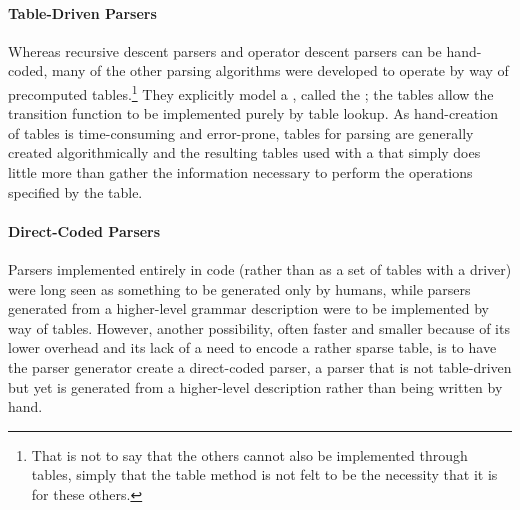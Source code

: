 
\paragraph{Table-Driven Parsers}
Whereas recursive descent parsers and operator descent parsers can be hand-coded, many of the other parsing algorithms were developed to operate by way of precomputed tables.\footnote{That is not to say that the others cannot also be implemented through tables, simply that the table method is not felt to be the necessity that it is for these others.} They explicitly model a \FA, called the ; the tables allow the transition function to be implemented purely by table lookup. As hand-creation of tables is time-consuming and error-prone, tables for parsing are generally created algorithmically and the resulting tables used with a  that simply does little more than gather the information necessary to perform the operations specified by the table.

\paragraph{Direct-Coded Parsers}
Parsers implemented entirely in code (rather than as a set of tables with a driver) were long seen as something to be generated only by humans, while parsers generated from a higher-level grammar description were to be implemented by way of tables. However, another possibility, often faster and smaller because of its lower overhead and its lack of a need to encode a rather sparse table, is to have the parser generator create a direct-coded parser, a parser that is not table-driven but yet is generated from a higher-level description rather than being written by hand.

